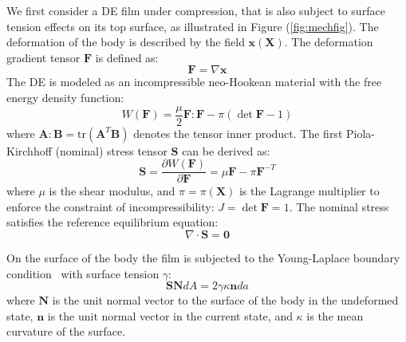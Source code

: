 \documentclass[final,3p,times]{elsarticle}
\begin{document}
We first consider a DE film under compression, that is also subject to surface tension effects on its top surface, as illustrated in Figure (\ref{fig:mechfig}). The deformation of the body is described by the field $\mathbf{x}(\mathbf{X})$. The deformation gradient tensor $\mathbf{F}$ is defined as:
\begin{equation}
	\mathbf{F}=\nabla \mathbf{x}
	\label{eq:defgrad1}
\end{equation}
The DE is modeled as an incompressible neo-Hookean material with the free energy density function:
\begin{equation}
	W(\mathbf{F})=\frac{\mu}{2}\mathbf{F} : \mathbf{F}-\pi(\det{\mathbf{F}}-1)
	\label{eq:neoHookean}
\end{equation}
where $\mathbf{A} : \mathbf{B} = \text{tr}(\mathbf{A}^T \mathbf{B})$ denotes the tensor inner product. The first Piola-Kirchhoff (nominal) stress tensor $\mathbf{S}$ can be derived as:
\begin{equation}
	\mathbf{S}=\frac{\partial W(\mathbf{F})}{\partial \mathbf{F}}=\mu\mathbf{F}-\pi \mathbf{F}^{-T}
	\label{eq:mechstress1}
\end{equation}
where $\mu$ is the shear modulus, and $\pi=\pi(\mathbf{X})$ is the Lagrange multiplier to enforce the constraint of incompressibility: $J=\det{\mathbf{F}}=1$. 
The nominal stress satisfies the reference equilibrium equation:
\begin{equation}
	\nabla \cdot \mathbf{S} = \mathbf{0}
	\label{eq:equil_equ}
\end{equation}

On the surface of the body the film is subjected to the Young-Laplace boundary condition~\citep{saksonoCM2006} with surface tension $\gamma$:
\begin{equation}
	\mathbf{S}\mathbf{N}dA=2\gamma\kappa \mathbf{n} da
	\label{eq:YLBC}
\end{equation}
where $\mathbf{N}$ is the unit normal vector to the surface of the body in the undeformed state, $\mathbf{n}$ is the unit normal vector in the current state, and $\kappa$ is the mean curvature of the surface. 
\end{document}
